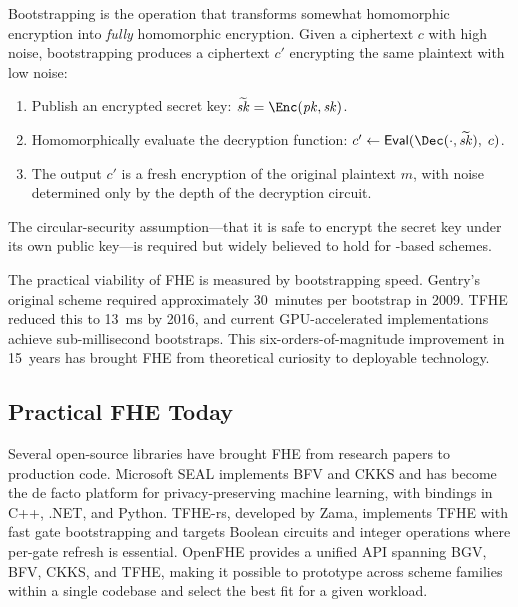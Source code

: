 Bootstrapping is the operation that transforms somewhat homomorphic encryption into \emph{fully} homomorphic encryption.  Given a ciphertext $c$ with high noise, bootstrapping produces a ciphertext $c'$ encrypting the same plaintext with low noise:

\begin{enumerate}
\item Publish an encrypted secret key: $\widetilde{\mathit{sk}} = \Enc(\mathit{pk}, \mathit{sk})$.
\item Homomorphically evaluate the decryption function: $c' \leftarrow \mathsf{Eval}(\Dec(\cdot, \widetilde{\mathit{sk}}),\; c)$.
\item The output $c'$ is a fresh encryption of the original plaintext $m$, with noise determined only by the depth of the decryption circuit.
\end{enumerate}

The circular-security assumption---that it is safe to encrypt the secret key under its own public key---is required but widely believed to hold for \lwe{}-based schemes.

\begin{example}
\label{ex:bootstrap-progress}
The practical viability of FHE is measured by bootstrapping speed.  Gentry's original scheme required approximately 30~minutes per bootstrap in 2009.  TFHE reduced this to 13~ms by 2016, and current GPU-accelerated implementations achieve sub-millisecond bootstraps.  This six-orders-of-magnitude improvement in 15~years has brought FHE from theoretical curiosity to deployable technology.
\end{example}


\subsection{Practical FHE Today}
\label{subsec:fhe-practice}

Several open-source libraries have brought FHE from research papers to production code.  Microsoft SEAL implements BFV and CKKS and has become the de facto platform for privacy-preserving machine learning, with bindings in C++, .NET, and Python.  TFHE-rs, developed by Zama, implements TFHE with fast gate bootstrapping and targets Boolean circuits and integer operations where per-gate refresh is essential.  OpenFHE provides a unified API spanning BGV, BFV, CKKS, and TFHE, making it possible to prototype across scheme families within a single codebase and select the best fit for a given workload.

